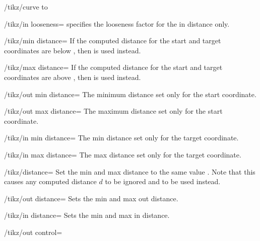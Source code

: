 \begin{key}{/tikz/curve to}
  \begin{key}{/tikz/in looseness=}
    specifies the looseness factor for the in distance only.
  \end{key}
  \begin{key}{/tikz/min distance=}
    If the computed distance for the start and target coordinates are
    below , then  is used instead.
  \end{key}
  \begin{key}{/tikz/max distance=}
    If the computed distance for the start and target coordinates are
    above , then  is used instead.
  \end{key}
  \begin{key}{/tikz/out min distance=}
    The minimum distance set only for the start coordinate.
  \end{key}
  \begin{key}{/tikz/out max distance=}
    The maximum distance set only for the start coordinate.
  \end{key}
  \begin{key}{/tikz/in min distance=}
    The min distance set only for the target coordinate.
  \end{key}
  \begin{key}{/tikz/in max distance=}
    The max distance set only for the target coordinate.
  \end{key}
  \begin{key}{/tikz/distance=}
    Set the min and max distance to the same value . Note
    that this causes any computed distance $d$ to be ignored and
     to be used instead.
\begin{codeexample}[]
\end{codeexample}
  \end{key}
  \begin{key}{/tikz/out distance=}
    Sets the min and max out distance.
  \end{key}
  \begin{key}{/tikz/in distance=}
    Sets the min and max in distance.
  \end{key}
  \begin{key}{/tikz/out control=}

\end{key}
\end{key}
